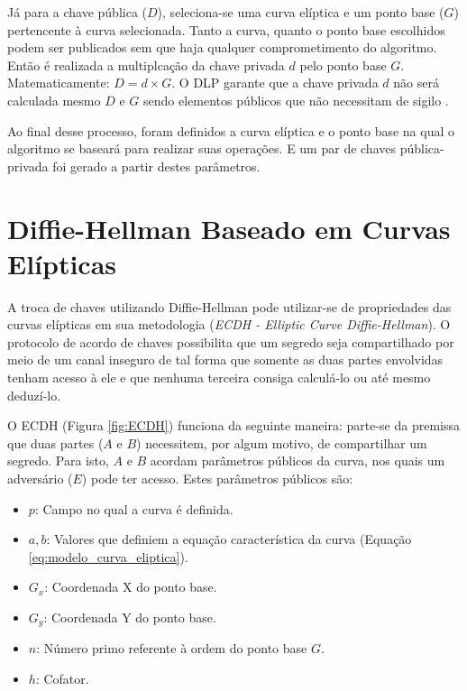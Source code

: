 \documentclass[12pt]{article}
\begin{document}
            Já para a chave pública ($D$), seleciona-se uma curva elíptica e um ponto base ($G$) pertencente à curva selecionada. Tanto a curva, quanto o ponto base escolhidos podem ser publicados sem que haja qualquer comprometimento do algoritmo. Então é realizada a multiplcação da chave privada $d$ pelo ponto base $G$. Matematicamente: $D = d \times G$. O DLP garante que a chave privada $d$ não será calculada mesmo $D$ e $G$ sendo elementos públicos que não necessitam de sigilo \cite{dahab2000overview}.

            Ao final desse processo, foram definidos a curva elíptica e o ponto base na qual o algoritmo se baseará para realizar suas operações. E um par de chaves pública-privada foi gerado a partir destes parâmetros.

    \section{Diffie-Hellman Baseado em Curvas Elípticas}
    \label{sec:diffie_hellman}

        A troca de chaves utilizando Diffie-Hellman pode utilizar-se de propriedades das curvas elípticas em sua metodologia (\textit{ECDH - Elliptic Curve Diffie-Hellman}). O protocolo de acordo de chaves possibilita que um segredo  seja compartilhado por meio de um canal inseguro de tal forma que somente as duas partes envolvidas tenham acesso à ele e que nenhuma terceira consiga calculá-lo ou até mesmo deduzí-lo.

        O ECDH (Figura \ref{fig:ECDH}) funciona da seguinte maneira: parte-se da premissa que duas partes ($A$ e $B$) necessitem, por algum motivo, de compartilhar um segredo. Para isto, $A$ e $B$ acordam parâmetros públicos da curva, nos quais um adversário ($E$) pode ter acesso. Estes parâmetros públicos são:

        \begin{itemize}
            \item $p$: Campo no qual a curva é definida.
            \item $a, b$: Valores que definiem a equação característica da curva (Equação \ref{eq:modelo_curva_eliptica}).
            \item $G_{x}$: Coordenada X do ponto base.
            \item $G_{y}$: Coordenada Y do ponto base.
            \item $n$: Número primo referente à ordem do ponto base $G$.
            \item $h$: Cofator.
        \end{itemize}
\end{document}
